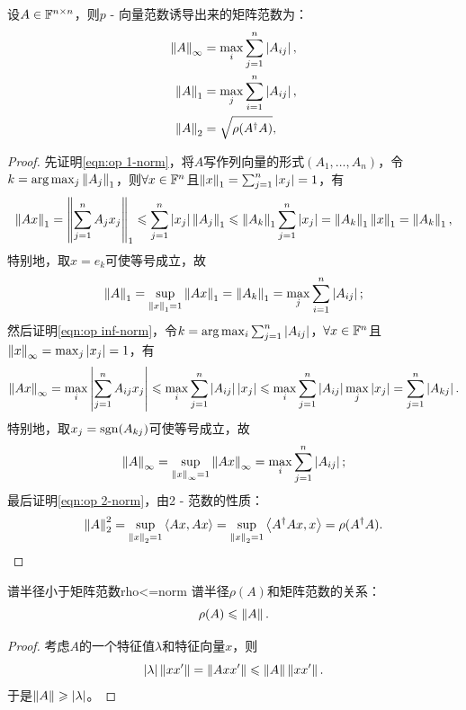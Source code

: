 \begin{example}
    {}{}
    设$A\in\mathbb F^{n\times n}$，则$p$ - 向量范数诱导出来的矩阵范数为：
    \begin{subequations}
        \label{eqn:op norm}
        \begin{align}
            \label{eqn:op inf-norm}
            \left\lVert A\right\rVert_\infty&=\max_{i}\sum_{j=1}^n\left\lvert A_{ij}\right\rvert,\\
            \label{eqn:op 1-norm}
            \left\lVert A\right\rVert_1&=\max_{j}\sum_{i=1}^n\left\lvert A_{ij}\right\rvert,\\
            \label{eqn:op 2-norm}
            \left\lVert A\right\rVert_2&=\sqrt{\rho(A^\dagger A)},
        \end{align}
    \end{subequations}
    \begin{proof}
        先证明\eqref{eqn:op 1-norm}，将$A$写作列向量的形式$(A_1,\ldots,A_n)$，令$k=\arg\max_j\left\lVert A_j\right\rVert_1$，则$\forall x\in\mathbb F^n$且$\left\lVert x\right\rVert_1=\sum_{j=1}^n\left\lvert x_j\right\rvert=1$，有
        \[
            \left\lVert Ax\right\rVert_1=\left\lVert\sum_{j=1}^nA_jx_j\right\rVert_1\leqslant\sum_{j=1}^n\left\lvert x_j\right\rvert\left\lVert A_j\right\rVert_1\leqslant\left\lVert A_k\right\rVert_1\sum_{j=1}^n\left\lvert x_j\right\rvert=\left\lVert A_k\right\rVert_1\left\lVert x\right\rVert_1=\left\lVert A_k\right\rVert_1,
        \]
        特别地，取$x=e_k$可使等号成立，故
        \[
            \left\lVert A\right\rVert_1=\sup_{\left\lVert x\right\rVert_1=1}\left\lVert Ax\right\rVert_1=\left\lVert A_k\right\rVert_1=\max_{j}\sum_{i=1}^n\left\lvert A_{ij}\right\rvert;
        \]
        然后证明\eqref{eqn:op inf-norm}，令$k=\arg\max_i\sum_{j=1}^n\left\lvert A_{ij}\right\rvert$，$\forall x\in\mathbb F^n$且$\left\lVert x\right\rVert_\infty=\max_j\left\lvert x_j\right\rvert=1$，有
        \[
            \left\lVert Ax\right\rVert_\infty=\max_i\left\lvert\sum_{j=1}^nA_{ij}x_j\right\rvert\leqslant\max_i\sum_{j=1}^n\left\lvert A_{ij}\right\rvert\left\lvert x_j\right\rvert\leqslant\max_i\sum_{j=1}^n\left\lvert A_{ij}\right\rvert\max_j\left\lvert x_j\right\rvert=\sum_{j=1}^n\left\lvert A_{kj}\right\rvert.
        \]
        特别地，取$x_j=\operatorname{sgn}(A_{kj})$可使等号成立，故 
        \[
            \left\lVert A\right\rVert_\infty=\sup_{\left\lVert x\right\rVert_\infty=1}\left\lVert Ax\right\rVert_\infty=\max_i\sum_{j=1}^n\left\lvert A_{ij}\right\rvert;
        \]
        最后证明\eqref{eqn:op 2-norm}，由2 - 范数的性质：
        \[
            \left\lVert A\right\rVert_2^2=\sup_{\left\lVert x\right\rVert_2=1}\left\langle Ax,Ax\right\rangle=\sup_{\left\lVert x\right\rVert_2=1}\left\langle A^\dagger Ax,x\right\rangle=\rho(A^\dagger A).
            \qedhere
        \]
    \end{proof}
\end{example}

\begin{theorem}
    {谱半径小于矩阵范数}{rho<=norm}
    谱半径$\rho(A)$和矩阵范数的关系：
    \begin{equation}
        \rho(A)\leqslant\left\lVert A\right\rVert.
    \end{equation}
\end{theorem}

\begin{proof}
    考虑$A$的一个特征值$\lambda$和特征向量$x$，则 
    \[
        \left\lvert\lambda\right\rvert\left\lVert xx'\right\rVert=\left\lVert Axx'\right\rVert\leqslant\left\lVert A\right\rVert\left\lVert xx'\right\rVert.
    \]
    于是$\left\lVert A\right\rVert\geqslant\left\lvert\lambda\right\rvert$。
\end{proof}

